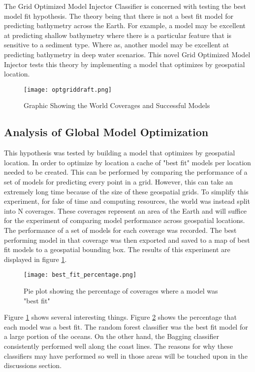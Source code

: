 The Grid Optimized Model Injector Classifier is concerned with testing the best model fit hypothesis.
The theory being that there is not a best fit model for predicting bathymetry across the Earth.
For example, a model may be excellent at predicting shallow bathymetry where there is a particular feature that is sensitive to a sediment type.
Where as, another model may be excellent at predicting bathymetry in deep water scenarios.
This novel Grid Optimized Model Injector tests this theory by implementing a model that optimizes by geospatial location.

\begin{figure}[h]
    \centering
    \texttt{[image: optgriddraft.png]}
    \caption{Graphic Showing the World Coverages and Successful Models}
    \label{fig:coveragegrid}
\end{figure}

\subsection{Analysis of Global Model Optimization}
This hypothesis was tested by building a model that optimizes by geospatial location.
In order to optimize by location a cache of "best fit" models per location needed to be created.
This can be performed by comparing the performance of a set of models for predicting every point in a grid.
However, this can take an extremely long time because of the size of these geospatial grids.
To simplify this experiment, for fake of time and computing resources, the world was instead split into N coverages.
These coverages represent an area of the Earth and will suffice for the experiment of comparing model performance across geospatial locations.
The performance of a set of models for each coverage was recorded.
The best performing model in that coverage was then exported and saved to a map of best fit models to a geospatial bounding box.
The results of this experiment are displayed in figure \ref{fig:coveragegrid}.

\begin{figure}[h]
    \centering
    \texttt{[image: best\_fit\_percentage.png]}
    \caption{Pie plot showing the percentage of coverages where a model was "best fit"}
    \label{fig:pie_best_fit}
\end{figure}

\par
Figure \ref{fig:coveragegrid} shows several interesting things.
Figure \ref{fig:pie_best_fit} shows the percentage that each model was a best fit.
The random forest classifier was the best fit model for a large portion of the oceans.
On the other hand, the Bagging classifier consistently performed well along the coast lines.
The reasons for why these classifiers may have performed so well in those areas will be touched upon in the discussions section.


